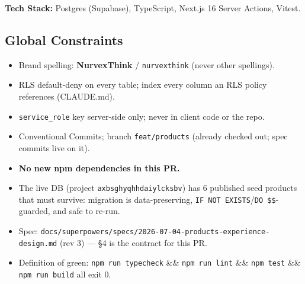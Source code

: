 \documentclass[11pt,a4paper]{article}
\begin{document}
\textbf{Tech Stack:} Postgres (Supabase), TypeScript, Next.js 16 Server Actions, Vitest.

\subsection*{Global Constraints}
\begin{itemize}
  \item Brand spelling: \textbf{NurvexThink} / \texttt{nurvexthink} (never other spellings).
  \item RLS default-deny on every table; index every column an RLS policy references (CLAUDE.md).
  \item \texttt{service\_role} key server-side only; never in client code or the repo.
  \item Conventional Commits; branch \texttt{feat/products} (already checked out; spec commits
        live on it).
  \item \textbf{No new npm dependencies in this PR.}
  \item The live DB (project \texttt{axbsghyqhhdaiylcksbv}) has 6 published seed products that
        must survive: migration is data-preserving, \texttt{IF NOT EXISTS}/\texttt{DO \$\$}-guarded,
        and safe to re-run.
  \item Spec: \texttt{docs/superpowers/specs/2026-07-04-products-experience-design.md} (rev 3)
        --- \S4 is the contract for this PR.
  \item Definition of green: \texttt{npm run typecheck} \&\& \texttt{npm run lint} \&\&
        \texttt{npm test} \&\& \texttt{npm run build} all exit 0.
\end{itemize}
\end{document}
